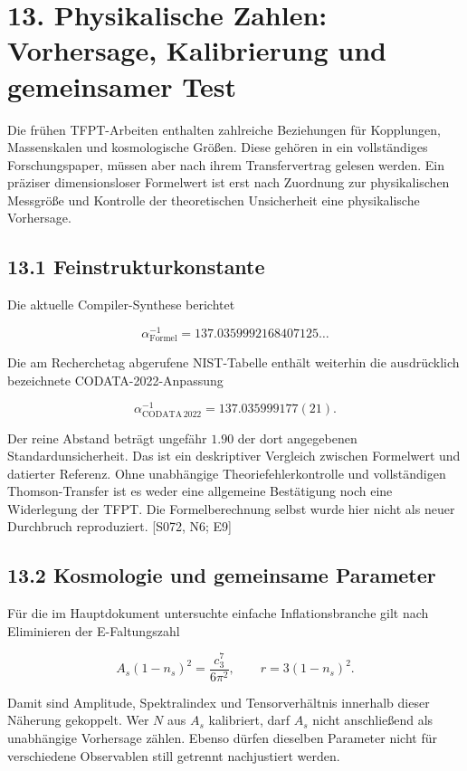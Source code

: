 \section{13. Physikalische Zahlen: Vorhersage, Kalibrierung und
gemeinsamer
Test}\label{physikalische-zahlen-vorhersage-kalibrierung-und-gemeinsamer-test}

Die frühen TFPT-Arbeiten enthalten zahlreiche Beziehungen für
Kopplungen, Massenskalen und kosmologische Größen. Diese gehören in ein
vollständiges Forschungspaper, müssen aber nach ihrem Transfervertrag
gelesen werden. Ein präziser dimensionsloser Formelwert ist erst nach
Zuordnung zur physikalischen Messgröße und Kontrolle der theoretischen
Unsicherheit eine physikalische Vorhersage.

\subsection{13.1 Feinstrukturkonstante}\label{feinstrukturkonstante}

Die aktuelle Compiler-Synthese berichtet

\[\alpha^{-1}_{\mathrm{Formel}}
=137.0359992168407125\ldots\]

Die am Recherchetag abgerufene NIST-Tabelle enthält weiterhin die
ausdrücklich bezeichnete CODATA-2022-Anpassung

\[\alpha^{-1}_{\mathrm{CODATA\,2022}}=137.035999177(21).\]

Der reine Abstand beträgt ungefähr \(1.90\) der dort angegebenen
Standardunsicherheit. Das ist ein deskriptiver Vergleich zwischen
Formelwert und datierter Referenz. Ohne unabhängige
Theoriefehlerkontrolle und vollständigen Thomson-Transfer ist es weder
eine allgemeine Bestätigung noch eine Widerlegung der TFPT. Die
Formelberechnung selbst wurde hier nicht als neuer Durchbruch
reproduziert. {[}S072, N6; E9{]}

\subsection{13.2 Kosmologie und gemeinsame
Parameter}\label{kosmologie-und-gemeinsame-parameter}

Für die im Hauptdokument untersuchte einfache Inflationsbranche gilt
nach Eliminieren der E-Faltungszahl

\[A_s(1-n_s)^2=\frac{c_3^7}{6\pi^2},\qquad
r=3(1-n_s)^2.\]

Damit sind Amplitude, Spektralindex und Tensorverhältnis innerhalb
dieser Näherung gekoppelt. Wer \(N\) aus \(A_s\) kalibriert, darf
\(A_s\) nicht anschließend als unabhängige Vorhersage zählen. Ebenso
dürfen dieselben Parameter nicht für verschiedene Observablen still
getrennt nachjustiert werden.

